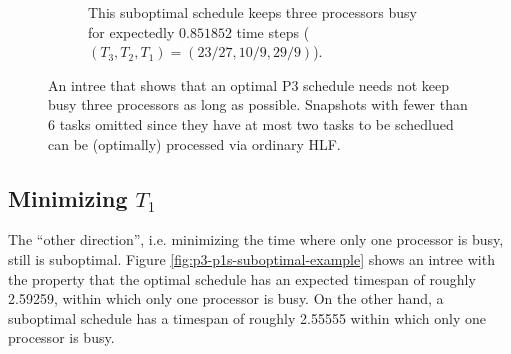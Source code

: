 \begin{figure}[ht]
\begin{subfigure}{.45\linewidth}
    \caption{This suboptimal schedule keeps three processors busy for expectedly $0.851852$ time steps ($(T_3, T_2, T_1)=(23/27,10/9,29/9)$).}
  \end{subfigure}
  \caption{An intree that shows that an optimal P3 schedule needs not keep busy three processors as long as possible. Snapshots with fewer than 6 tasks omitted since they have at most two tasks to be schedlued can be (optimally) processed via ordinary HLF.}
  \label{fig:p3-p3l-suboptimal-example}
\end{figure}

\subsection{Minimizing $T_1$}
\label{sec:p3-disproving-short-p1}

The ``other direction'', i.e. minimizing the time where only one processor is busy, still is suboptimal.
Figure \ref{fig:p3-p1s-suboptimal-example} shows an intree with the property that the optimal schedule has an expected timespan of roughly 2.59259, within which only one processor is busy. On the other hand, a suboptimal schedule has a timespan of roughly 2.55555 within which only one processor is busy.

